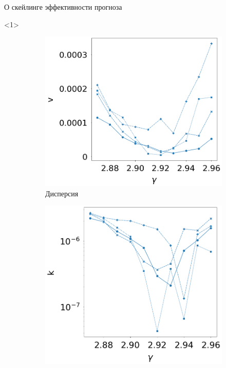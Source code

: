 \documentclass{beamer}
\begin{document}
	\begin{frame}{О скейлинге эффективности прогноза}
		\begin{onlyenv}<1>
			\begin{figure}[h]
				\centering
				\centering
				\hspace{-15mm}
				\begin{subfigure}[t]{0.27\textwidth}
					\centering
					\includegraphics[height=\textwidth]{images/var_btw}
					\caption{Дисперсия}
				\end{subfigure}
				\hspace{5mm}
				\begin{subfigure}[t]{0.27\textwidth}
					\centering
					\includegraphics[height=\textwidth]{images/k_btw}

\end{subfigure}
\end{figure}
\end{onlyenv}
\end{frame}
\end{document}
